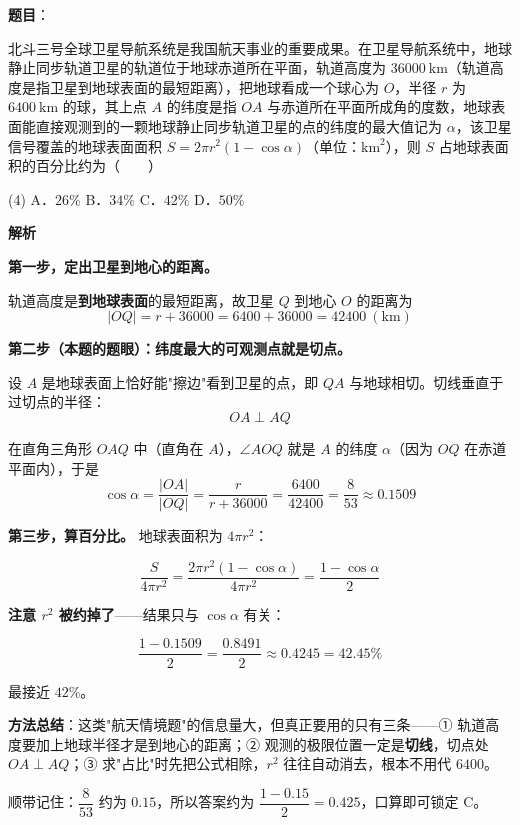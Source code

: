 \begin{answer}

\textbf{题目}：

北斗三号全球卫星导航系统是我国航天事业的重要成果。在卫星导航系统中，地球静止同步轨道卫星的轨道位于地球赤道所在平面，轨道高度为 $36000\ \mathrm{km}$（轨道高度是指卫星到地球表面的最短距离），把地球看成一个球心为 $O$，半径 $r$ 为 $6400\ \mathrm{km}$ 的球，其上点 $A$ 的纬度是指 $OA$ 与赤道所在平面所成角的度数，地球表面能直接观测到的一颗地球静止同步轨道卫星的点的纬度的最大值记为 $\alpha$，该卫星信号覆盖的地球表面面积 $S=2\pi r^{2}(1-\cos\alpha)$（单位：$\mathrm{km}^{2}$），则 $S$ 占地球表面积的百分比约为\mbox{（　　）}

\begin{gkopts}(4)
\task A．$26\%$
\task B．$34\%$
\task C．$42\%$
\task D．$50\%$
\end{gkopts}

\textbf{解析}

\textbf{第一步，定出卫星到地心的距离。}

轨道高度是\textbf{到地球表面}的最短距离，故卫星 $Q$ 到地心 $O$ 的距离为
\nopagebreak[4]
\[|OQ|=r+36000=6400+36000=42400\ (\mathrm{km})\]

\textbf{第二步（本题的题眼）：纬度最大的可观测点就是切点。}

设 $A$ 是地球表面上恰好能"擦边"看到卫星的点，即 $QA$ 与地球相切。切线垂直于过切点的半径：
\nopagebreak[4]
\[OA\perp AQ\]

在直角三角形 $OAQ$ 中（直角在 $A$），$\angle AOQ$ 就是 $A$ 的纬度 $\alpha$（因为 $OQ$ 在赤道平面内），于是
\nopagebreak[4]
\[\cos\alpha=\frac{|OA|}{|OQ|}=\frac r{r+36000}=\frac{6400}{42400}=\frac{8}{53}\approx0.1509\]

\textbf{第三步，算百分比。} 地球表面积为 $4\pi r^{2}$：

\nopagebreak[4]
\[\frac S{4\pi r^{2}}=\frac{2\pi r^{2}(1-\cos\alpha)}{4\pi r^{2}}=\frac{1-\cos\alpha}2\]

\textbf{注意 $r^{2}$ 被约掉了}——结果只与 $\cos\alpha$ 有关：

\nopagebreak[4]
\[\frac{1-0.1509}2=\frac{0.8491}2\approx0.4245=42.45\%\]

最接近 $42\%$。

\begin{gktip}
\textbf{方法总结}：这类"航天情境题"的信息量大，但真正要用的只有三条——① 轨道高度要加上地球半径才是到地心的距离；② 观测的极限位置一定是\textbf{切线}，切点处 $OA\perp AQ$；③ 求"占比"时先把公式相除，$r^{2}$ 往往自动消去，根本不用代 $6400$。

顺带记住：$\dfrac{8}{53}$ 约为 $0.15$，所以答案约为 $\dfrac{1-0.15}2=0.425$，口算即可锁定 C。
\end{gktip}


\par\medskip

\end{answer}
